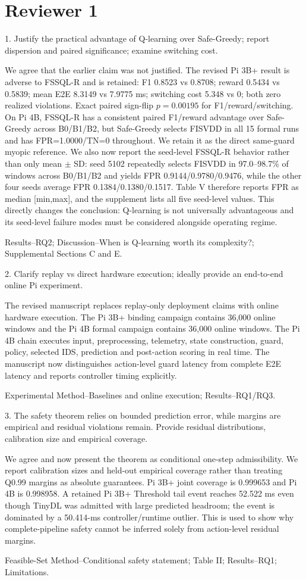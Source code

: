 \documentclass[11pt,a4paper]{article}
\newcommand{\commentbox}[1]{\begin{rcommentbox}#1\end{rcommentbox}}
\newcommand{\responsebox}[1]{\begin{authorresponsebox}#1\end{authorresponsebox}}
\newcommand{\changebox}[1]{\begin{wherebox}#1\end{wherebox}}
\begin{document}
\section*{Reviewer 1}

\commentbox{1. Justify the practical advantage of Q-learning over Safe-Greedy; report dispersion and paired significance; examine switching cost.}
\responsebox{We agree that the earlier claim was not justified. The revised Pi 3B+ result is adverse to FSSQL-R and is retained: F1 0.8523 vs 0.8708; reward 0.5434 vs 0.5839; mean E2E 8.3149 vs 7.9775 ms; switching cost 5.348 vs 0; both zero realized violations. Exact paired sign-flip $p=0.00195$ for F1/reward/switching. On Pi 4B, FSSQL-R has a consistent paired F1/reward advantage over Safe-Greedy across B0/B1/B2, but Safe-Greedy selects FISVDD in all 15 formal runs and has FPR=1.0000/TN=0 throughout. We retain it as the direct same-guard myopic reference. We also now report the seed-level FSSQL-R behavior rather than only mean $\pm$ SD: seed 5102 repeatedly selects FISVDD in 97.0--98.7\% of windows across B0/B1/B2 and yields FPR 0.9144/0.9780/0.9476, while the other four seeds average FPR 0.1384/0.1380/0.1517. Table V therefore reports FPR as median [min,max], and the supplement lists all five seed-level values. This directly changes the conclusion: Q-learning is not universally advantageous and its seed-level failure modes must be considered alongside operating regime.}
\changebox{Results--RQ2; Discussion--When is Q-learning worth its complexity?; Supplemental Sections C and E.}

\commentbox{2. Clarify replay vs direct hardware execution; ideally provide an end-to-end online Pi experiment.}
\responsebox{The revised manuscript replaces replay-only deployment claims with online hardware execution. The Pi 3B+ binding campaign contains 36,000 online windows and the Pi 4B formal campaign contains 36,000 online windows. The Pi 4B chain executes input, preprocessing, telemetry, state construction, guard, policy, selected IDS, prediction and post-action scoring in real time. The manuscript now distinguishes action-level guard latency from complete E2E latency and reports controller timing explicitly.}
\changebox{Experimental Method--Baselines and online execution; Results--RQ1/RQ3.}

\commentbox{3. The safety theorem relies on bounded prediction error, while margins are empirical and residual violations remain. Provide residual distributions, calibration size and empirical coverage.}
\responsebox{We agree and now present the theorem as conditional one-step admissibility. We report calibration sizes and held-out empirical coverage rather than treating Q0.99 margins as absolute guarantees. Pi 3B+ joint coverage is 0.999653 and Pi 4B is 0.998958. A retained Pi 3B+ Threshold tail event reaches 52.522 ms even though TinyDL was admitted with large predicted headroom; the event is dominated by a 50.414-ms controller/runtime outlier. This is used to show why complete-pipeline safety cannot be inferred solely from action-level residual margins.}
\changebox{Feasible-Set Method--Conditional safety statement; Table II; Results--RQ1; Limitations.}
\end{document}
